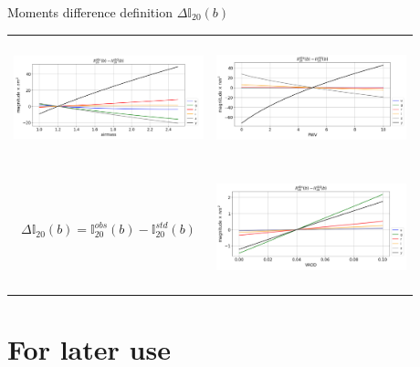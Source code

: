 \documentclass{beamer}
\begin{document}
\begin{frame}{Moments difference definition $\Delta \mathbb{I}_{20}(b)$}
\begin{tabular}{cc}
\includegraphics[width=5.5cm,height=3.5cm,angle=0]{figs/PCCorr/fig1_II20diff_airmass.png}
&
\includegraphics[width=5.5cm,height=3.5cm,angle=0]{figs/PCCorr/fig2_II20diff_PWV.png} \\

 $\boxed{\Delta \mathbb{I}_{20}(b)  =   \mathbb{I}_{20}^{obs}(b)  -  \mathbb{I}_{20}^{std}(b)}$ & \includegraphics[width=5.5cm,height=3.5cm,angle=0]{figs/PCCorr/fig3_II20diff_aer.png}
\end{tabular}
\end{frame}




\section{For later use}
\begin{frame}\sectionpage\end{frame}
\end{document}
